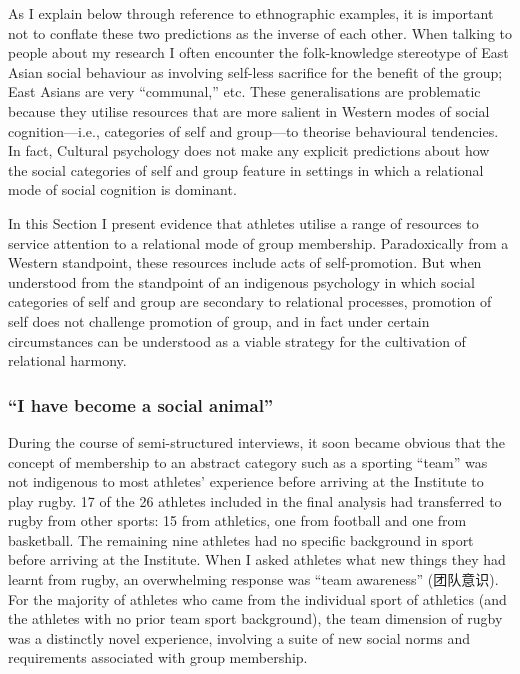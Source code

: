 \begin{CJK}{UTF8}{gbsn}
As I explain below through reference to ethnographic examples, it is important not to conflate these two predictions as the inverse of each other.  When talking to people about my research I often encounter the folk-knowledge stereotype of East Asian social behaviour as involving self-less sacrifice for the benefit of the group; East Asians are very ``communal,'' etc.  These generalisations are problematic because they utilise resources that are more salient in Western modes of social cognition---i.e., categories of self and group---to theorise behavioural tendencies.  In fact, Cultural psychology does not make any explicit predictions about how the social categories of self and group feature in settings in which a relational mode of social cognition is dominant.

In this Section I present evidence that athletes utilise a range of resources to service attention to a relational mode of group membership.  Paradoxically from a Western standpoint, these resources include acts of self-promotion.  But when understood from the standpoint of an indigenous psychology in which social categories of self and group are secondary to relational processes, promotion of self does not challenge promotion of group, and in fact under certain circumstances can be understood as a viable strategy for the cultivation of relational harmony.



  \subsubsection{``I have become a social animal''}

During the course of semi-structured interviews, it soon became obvious that the concept of membership to an abstract category such as a sporting ``team'' was not indigenous to most athletes' experience before arriving at the Institute to play rugby.  17 of the 26 athletes included in the final analysis had transferred to rugby from other sports: 15 from athletics, one from football and one from basketball.  The remaining nine athletes had no specific background in sport before arriving at the Institute.  When I asked athletes what new things they had learnt from rugby, an overwhelming response was ``team awareness'' (团队意识).  For the majority of athletes who came from the individual sport of athletics (and the athletes with no prior team sport background), the team dimension of rugby was a distinctly novel experience, involving a suite of new social norms and requirements associated with group membership.


\end{CJK}
